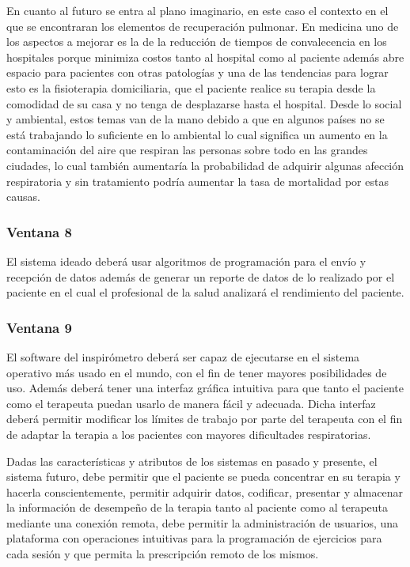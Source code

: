 \documentclass[12pt]{article}
\begin{document}
En cuanto al futuro se entra al plano imaginario, en este caso el contexto en el que se encontraran los elementos de recuperación pulmonar. 
En medicina uno de los aspectos a mejorar es la de la reducción de tiempos de convalecencia en los hospitales porque minimiza costos tanto al hospital como al paciente además abre espacio para pacientes con otras patologías y una de las tendencias para lograr esto es la fisioterapia domiciliaria, que el paciente realice su terapia desde la comodidad de su casa y no tenga de desplazarse hasta el hospital. Desde lo social y ambiental, estos temas van de la mano debido a que en algunos países no se está trabajando lo suficiente en lo ambiental lo cual significa un aumento en la contaminación del aire que respiran las personas sobre todo en las grandes ciudades, lo cual también aumentaría la probabilidad de adquirir algunas afección respiratoria y sin tratamiento podría aumentar la tasa de mortalidad por estas causas. 

\subsubsection{Ventana 8}

El sistema ideado deberá usar algoritmos de programación para el envío y recepción de datos además de generar un reporte de datos de lo realizado por el paciente en el cual el profesional de la salud analizará el rendimiento del paciente.

\subsubsection{Ventana 9}

El software del inspirómetro deberá ser capaz de ejecutarse en el sistema operativo más usado en el mundo, con el fin de tener mayores posibilidades de uso.  Además deberá tener una interfaz gráfica intuitiva para que tanto el paciente como el terapeuta puedan usarlo de manera fácil y adecuada. Dicha interfaz deberá permitir modificar los límites de trabajo por parte del terapeuta con el fin de adaptar la terapia a los pacientes con mayores dificultades respiratorias. 


Dadas las características y atributos de los sistemas en pasado y presente, el sistema futuro, debe permitir que el paciente se pueda concentrar en su terapia y hacerla conscientemente, permitir adquirir datos, codificar, presentar y almacenar la información de desempeño de la terapia tanto al paciente como al terapeuta mediante una conexión remota, debe permitir la administración de usuarios, una plataforma con operaciones intuitivas para la programación de ejercicios para cada sesión y que permita la prescripción remoto de los mismos.
\end{document}
